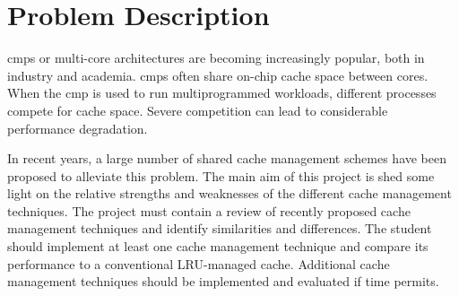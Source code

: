 
\section*{Problem Description}
\glspl{cmp} or multi-core architectures are becoming increasingly popular, both in industry and academia. 
\glspl{cmp} often share on-chip cache space between cores. 
When the \gls{cmp} is used to run multiprogrammed workloads, different processes compete for cache space. 
Severe competition can lead to considerable performance degradation. 

In recent years, a large number of shared cache management schemes have been proposed to alleviate this problem.
The main aim of this project is shed some light on the relative strengths and weaknesses of the different cache management techniques. 
The project must contain a review of recently proposed cache management techniques and identify similarities and differences. 
The student should implement at least one cache management technique and compare its performance to a conventional LRU-managed cache.
Additional cache management techniques should be implemented and evaluated if time permits.

\clearpage